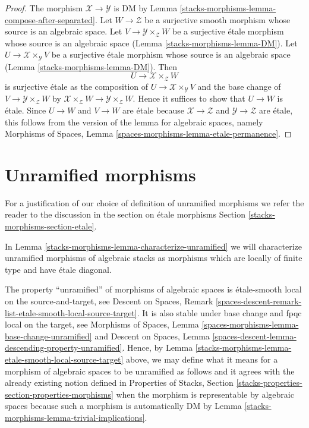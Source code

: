 \begin{proof}
The morphism $\mathcal{X} \to \mathcal{Y}$ is DM by
Lemma \ref{stacks-morphisms-lemma-compose-after-separated}.
Let $W \to \mathcal{Z}$ be a surjective smooth morphism
whose source is an algebraic space. Let
$V \to \mathcal{Y} \times_\mathcal{Z} W$ be a surjective
\'etale morphism whose source is an algebraic space
(Lemma \ref{stacks-morphisms-lemma-DM}).
Let $U \to \mathcal{X} \times_\mathcal{Y} V$ be a surjective
\'etale morphism whose source is an algebraic space
(Lemma \ref{stacks-morphisms-lemma-DM}).
Then
$$
U \longrightarrow \mathcal{X} \times_\mathcal{Z} W
$$
is surjective \'etale as the composition of
$U \to \mathcal{X} \times_\mathcal{Y} V$
and the base change of $V \to \mathcal{Y} \times_\mathcal{Z} W$
by $\mathcal{X} \times_\mathcal{Z} W \to \mathcal{Y} \times_\mathcal{Z} W$.
Hence it suffices to show that $U \to W$ is \'etale.
Since $U \to W$ and $V \to W$ are \'etale because
$\mathcal{X} \to \mathcal{Z}$ and $\mathcal{Y} \to \mathcal{Z}$
are \'etale, this follows from the version of the lemma for
algebraic spaces, namely
Morphisms of Spaces, Lemma \ref{spaces-morphisms-lemma-etale-permanence}.
\end{proof}

\section{Unramified morphisms}
\label{stacks-morphisms-section-unramified}
For a justification of our choice of definition of
unramified morphisms we refer the reader to the discussion
in the section on \'etale morphisms Section \ref{stacks-morphisms-section-etale}.

\medskip\noindent
In Lemma \ref{stacks-morphisms-lemma-characterize-unramified} we will characterize
unramified morphisms of algebraic stacks as morphisms which are
locally of finite type and have \'etale diagonal.

\medskip\noindent
The property ``unramified'' of morphisms of algebraic spaces
is \'etale-smooth local on the source-and-target, see
Descent on Spaces, Remark
\ref{spaces-descent-remark-list-etale-smooth-local-source-target}.
It is also stable under base change and fpqc local on the target, see
Morphisms of Spaces,
Lemma \ref{spaces-morphisms-lemma-base-change-unramified}
and
Descent on Spaces,
Lemma \ref{spaces-descent-lemma-descending-property-unramified}.
Hence, by
Lemma \ref{stacks-morphisms-lemma-etale-smooth-local-source-target}
above, we may define what it means for a morphism of algebraic spaces
to be unramified as follows and it agrees with the already existing notion
defined in Properties of Stacks, Section
\ref{stacks-properties-section-properties-morphisms}
when the morphism is representable by algebraic spaces
because such a morphism is automatically DM by
Lemma \ref{stacks-morphisms-lemma-trivial-implications}.

